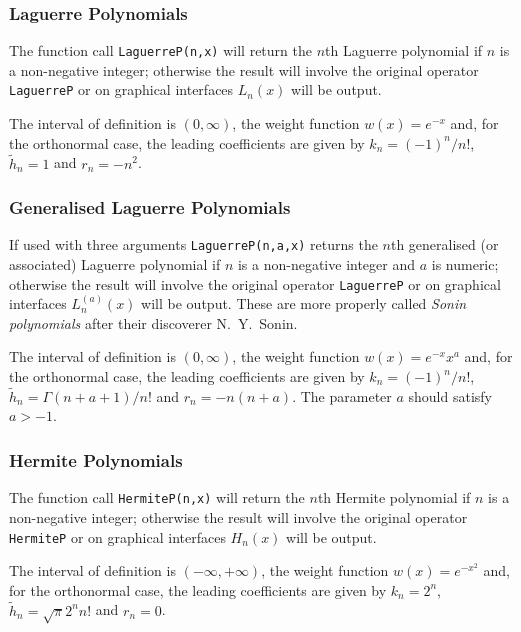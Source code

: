 \subsubsection{Laguerre Polynomials}
\hypertarget{LAGUERREP}{}
The function call \texttt{LaguerreP(n,x)} will return the $n$th Laguerre
polynomial if $n$ is a non-negative integer; otherwise the result will involve
the original operator \texttt{LaguerreP} or on graphical interfaces $L_n(x)$
will be output.

The interval of definition is $(0, \infty)$, the weight function
$w(x)=e^{-x}$ and, for the orthonormal case, the leading coefficients
are given by $k_n=(-1)^n/n!$, $\tilde{h}_n =1$ and $r_n = -n^2$.

\subsubsection{Generalised Laguerre Polynomials}
If used with three arguments \texttt{LaguerreP(n,a,x)} returns the $n$th
generalised (or associated) Laguerre polynomial if $n$ is a non-negative
integer and $a$ is numeric; otherwise the result will involve the original
operator \texttt{LaguerreP} or on graphical interfaces $L_n^{(a)}(x)$ will be
output. These are more properly called \emph{Sonin polynomials} after their
discoverer N.~Y.~Sonin.

The interval of definition is $(0, \infty)$, the weight function
$w(x)=e^{-x}x^a$ and, for the orthonormal case, the leading coefficients
are given by $k_n=(-1)^n/n!$, $\tilde{h}_n = \Gamma(n+a+1)/n!$ and
$r_n=-n(n+a)$. The parameter $a$ should satisfy $a > -1$.

\subsubsection{Hermite Polynomials}
\hypertarget{HERMITEP}{}
The function call \texttt{HermiteP(n,x)} will return the $n$th Hermite
polynomial if $n$ is a non-negative integer; otherwise the result will involve
the original operator \texttt{HermiteP} or on graphical interfaces $H_n(x)$
will be output.

The interval of definition is $(-\infty, +\infty)$, the weight function
$w(x)=e^{-x^2}$ and,
for the orthonormal case, the leading coefficients are given by
$k_n=2^n$, $\tilde{h}_n = \sqrt{\pi}2^nn!$ and $r_n=0$.

